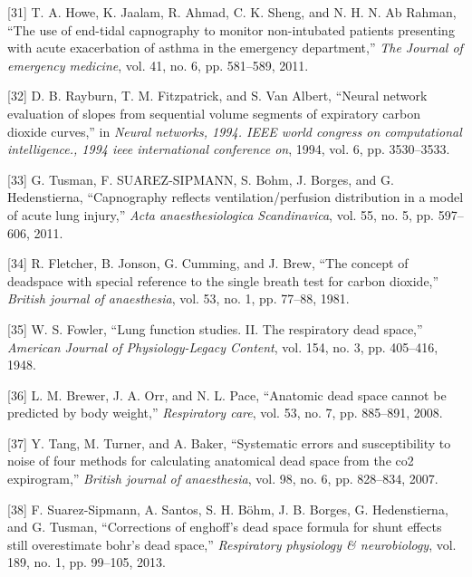 \documentclass[12pt,]{article}
\begin{document}
\leavevmode\hypertarget{ref-howe2011use}{}%
{[}31{]} T. A. Howe, K. Jaalam, R. Ahmad, C. K. Sheng, and N. H. N. Ab
Rahman, ``The use of end-tidal capnography to monitor non-intubated
patients presenting with acute exacerbation of asthma in the emergency
department,'' \emph{The Journal of emergency medicine}, vol. 41, no. 6,
pp. 581--589, 2011.

\leavevmode\hypertarget{ref-rayburn1994neural}{}%
{[}32{]} D. B. Rayburn, T. M. Fitzpatrick, and S. Van Albert, ``Neural
network evaluation of slopes from sequential volume segments of
expiratory carbon dioxide curves,'' in \emph{Neural networks, 1994. IEEE
world congress on computational intelligence., 1994 ieee international
conference on}, 1994, vol. 6, pp. 3530--3533.

\leavevmode\hypertarget{ref-tusman2011capnography}{}%
{[}33{]} G. Tusman, F. SUAREZ-SIPMANN, S. Bohm, J. Borges, and G.
Hedenstierna, ``Capnography reflects ventilation/perfusion distribution
in a model of acute lung injury,'' \emph{Acta anaesthesiologica
Scandinavica}, vol. 55, no. 5, pp. 597--606, 2011.

\leavevmode\hypertarget{ref-fletcher1981concept}{}%
{[}34{]} R. Fletcher, B. Jonson, G. Cumming, and J. Brew, ``The concept
of deadspace with special reference to the single breath test for carbon
dioxide,'' \emph{British journal of anaesthesia}, vol. 53, no. 1, pp.
77--88, 1981.

\leavevmode\hypertarget{ref-fowler1948lung}{}%
{[}35{]} W. S. Fowler, ``Lung function studies. II. The respiratory dead
space,'' \emph{American Journal of Physiology-Legacy Content}, vol. 154,
no. 3, pp. 405--416, 1948.

\leavevmode\hypertarget{ref-brewer2008anatomic}{}%
{[}36{]} L. M. Brewer, J. A. Orr, and N. L. Pace, ``Anatomic dead space
cannot be predicted by body weight,'' \emph{Respiratory care}, vol. 53,
no. 7, pp. 885--891, 2008.

\leavevmode\hypertarget{ref-tang2007systematic}{}%
{[}37{]} Y. Tang, M. Turner, and A. Baker, ``Systematic errors and
susceptibility to noise of four methods for calculating anatomical dead
space from the co2 expirogram,'' \emph{British journal of anaesthesia},
vol. 98, no. 6, pp. 828--834, 2007.

\leavevmode\hypertarget{ref-suarez2013corrections}{}%
{[}38{]} F. Suarez-Sipmann, A. Santos, S. H. Böhm, J. B. Borges, G.
Hedenstierna, and G. Tusman, ``Corrections of enghoff's dead space
formula for shunt effects still overestimate bohr's dead space,''
\emph{Respiratory physiology \& neurobiology}, vol. 189, no. 1, pp.
99--105, 2013.
\end{document}
